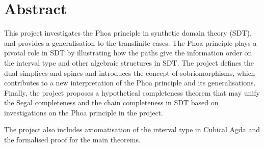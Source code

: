 
\chapter*{Abstract}

This project investigates the Phoa principle in synthetic domain theory (SDT), and provides a generalisation to the transfinite cases. The Phoa principle plays a pivotal role in SDT by illustrating how the paths give the information order on the interval type and other algebraic structures in SDT. The project defines the dual simplices and spines and introduces the concept of sobriomorphisms, which contributes to a new interpretation of the Phoa principle and its generalisations. Finally, the project proposes a hypothetical completeness theorem that may unify the Segal completeness and the chain completeness in SDT based on investigations on the Phoa principle in the project.

The project also includes axiomatisation of the interval type in Cubical Agda and the formalised proof for the main theorems.
